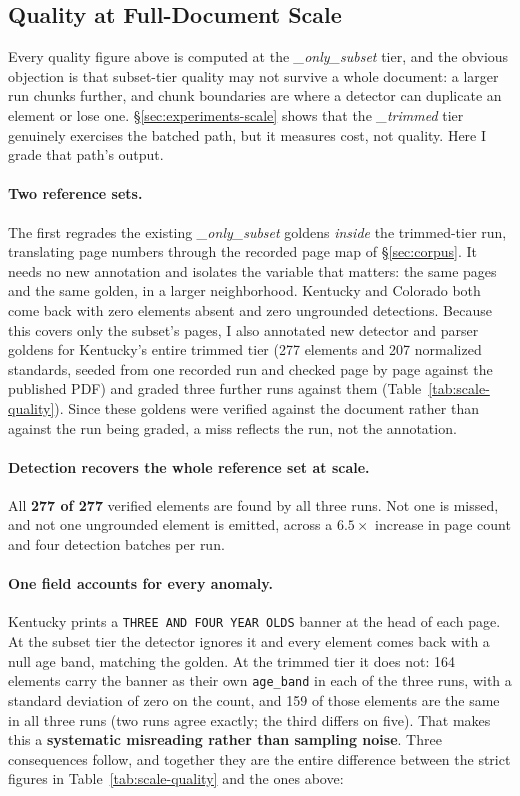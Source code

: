 \subsection{Quality at Full-Document Scale}
\label{sec:experiments-scale-quality}

Every quality figure above is computed at the \emph{\_only\_subset} tier, and
the obvious objection is that subset-tier quality may not survive a whole
document: a larger run chunks further, and chunk boundaries are where a
detector can duplicate an element or lose one. \S\ref{sec:experiments-scale}
shows that the \emph{\_trimmed} tier genuinely exercises the batched path, but
it measures cost, not quality. Here I grade that path's output.



\paragraph{Two reference sets.} The first regrades the existing
\emph{\_only\_subset} goldens \emph{inside} the trimmed-tier run, translating
page numbers through the recorded page map of \S\ref{sec:corpus}. It needs no
new annotation and isolates the variable that matters: the same pages and the
same golden, in a larger neighborhood. Kentucky and Colorado both come back
with zero elements absent and zero ungrounded detections. Because this covers
only the subset's pages, I also annotated new detector and parser goldens for
Kentucky's entire trimmed tier (277 elements and 207 normalized standards,
seeded from one recorded run and checked page by page against the published
PDF) and graded three further runs against them
(Table~\ref{tab:scale-quality}). Since these goldens were verified against the
document rather than against the run being graded, a miss reflects the run,
not the annotation.

\paragraph{Detection recovers the whole reference set at scale.} All \textbf{277 of 277} verified
elements are found by all three runs. Not one is missed, and not one ungrounded
element is emitted, across a $6.5\times$ increase in page count and four
detection batches per run.

\paragraph{One field accounts for every anomaly.} Kentucky prints a
\texttt{THREE AND FOUR YEAR OLDS} banner at the head of each page. At the subset
tier the detector ignores it and every element comes back with a null age band,
matching the golden. At the trimmed tier it does not: 164 elements carry the
banner as their own \texttt{age\_band} in each of the three runs, with a
standard deviation of zero on the count, and 159 of those elements are the
same in all three runs (two runs agree exactly; the third differs on five). That
makes this a \textbf{systematic misreading rather than sampling noise}. Three
consequences follow, and together they are the entire difference between the
strict figures in Table~\ref{tab:scale-quality} and the ones above:

